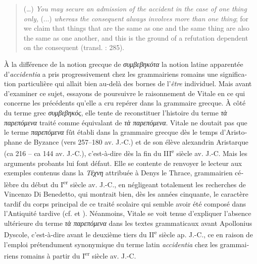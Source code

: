\documentclass[output=paper]{langsci/langscibook}
\begin{document}
\begin{otherlanguage}{french}
\begin{quote}
(…) \textit{You may secure an admission of the accident in the case of one thing only,} (...) \textit{whereas the consequent always involves more than one thing}; for we claim that things that are the same as one and the same thing are also the same as one another, and this is the ground of a refutation dependent on the consequent (transl. \citealt{barnes_complete_1984} : 285).

\end{quote}

À la différence de la notion grecque de \textit{συμβεβηκότα} la notion latine apparentée d’\textit{accidentia} a pris progressivement chez les grammairiens romains une signification particulière qui allait bien au-delà des bornes de l’\textit{être} individuel. Mais avant d’examiner ce sujet, essayons de poursuivre le raisonnement de Vitale en ce qui concerne les précédents qu’elle a cru repérer dans la grammaire grecque. À côté du terme grec \textit{συμβεβηκός}, elle tente de reconstituer l’histoire du terme \textit{τὰ παρεπόμενα} traité comme équivalant de \textit{τὰ παρεπόμενα}. Vitale ne doutait pas que le terme \textit{παρεπόμενα} fût établi dans la grammaire grecque dès le temps d’Aristophane de Byzance (vers 257–180 av. J.-C.) et de son élève alexandrin Aristarque (ca 216 – ca 144 av. J.-C.), c’est-à-dire dès la fin du III\textsuperscript{e} siècle av. J.-C. Mais les arguments probants lui font défaut. Elle se contente de renvoyer le lecteur aux exemples contenus dans la \textit{Τέχνη} attribuée à Denys le Thrace, grammairien célèbre du début du I\textsuperscript{er} siècle av. J.-C., en négligeant totalement les recherches de Vincenzo Di Benedetto, qui montrait bien, dès les années cinquante, le caractère tardif du corps principal de ce traité scolaire qui semble avoir été composé dans l’Antiquité tardive (cf. \citealt{di_benedetto_dionisio_1958} et \citeyear{di_benedetto_dionisio_1959}). Néanmoins, Vitale se voit tenue d’expliquer l’absence ultérieure du terme \textit{τὰ παρεπόμενα} dans les textes grammaticaux avant Apollonius Dyscole, c’est-à-dire avant le deuxième tiers du II\textsuperscript{e} siècle ap. J.-C., ce en raison de l’emploi prétendument synonymique du terme latin \textit{accidentia} chez les grammairiens romains à partir du I\textsuperscript{e}\textsuperscript{r} siècle av. J.-C.


\end{otherlanguage}
\end{document}
